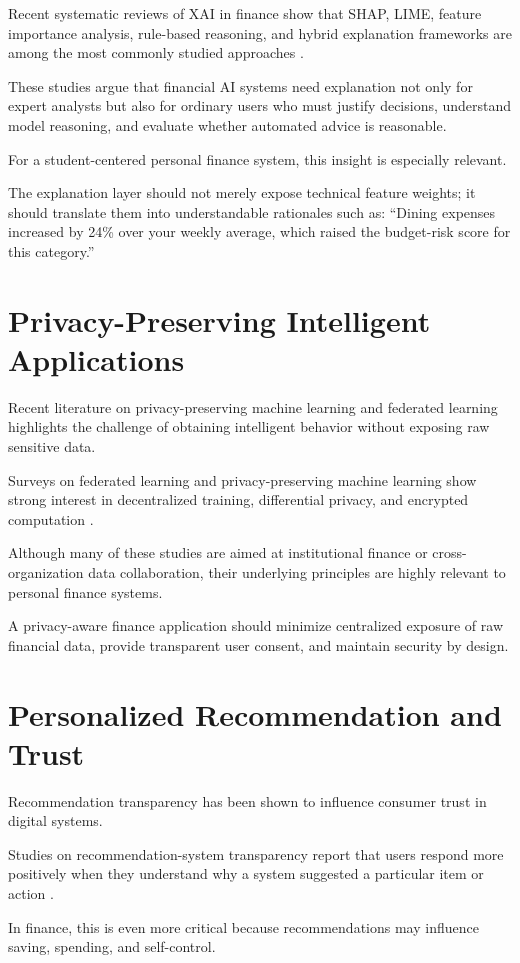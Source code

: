 \documentclass[12pt,a4paper]{report}
\begin{document}
Recent systematic reviews of XAI in finance show that SHAP,
LIME,
feature importance analysis,
rule-based reasoning,
and hybrid explanation frameworks are among the most commonly studied approaches \cite{ref7,ref8}.

These studies argue that financial AI systems need explanation not only for expert analysts but also for ordinary users who must justify decisions,
understand model reasoning,
and evaluate whether automated advice is reasonable.

For a student-centered personal finance system,
this insight is especially relevant.

The explanation layer should not merely expose technical feature weights;
it should translate them into understandable rationales such as:
``Dining expenses increased by 24\% over your weekly average,
which raised the budget-risk score for this category.''

\section{Privacy-Preserving Intelligent Applications}
Recent literature on privacy-preserving machine learning and federated learning highlights the challenge of obtaining intelligent behavior without exposing raw sensitive data.

Surveys on federated learning and privacy-preserving machine learning show strong interest in decentralized training,
differential privacy,
and encrypted computation \cite{ref10,ref11}.

Although many of these studies are aimed at institutional finance or cross-organization data collaboration,
their underlying principles are highly relevant to personal finance systems.

A privacy-aware finance application should minimize centralized exposure of raw financial data,
provide transparent user consent,
and maintain security by design.

\section{Personalized Recommendation and Trust}
Recommendation transparency has been shown to influence consumer trust in digital systems.

Studies on recommendation-system transparency report that users respond more positively when they understand why a system suggested a particular item or action \cite{ref9,ref17}.

In finance,
this is even more critical because recommendations may influence saving,
spending,
and self-control.
\end{document}
